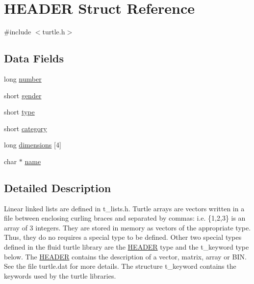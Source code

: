 \hypertarget{struct_h_e_a_d_e_r}{\section{H\-E\-A\-D\-E\-R Struct Reference}
\label{struct_h_e_a_d_e_r}
}


{\ttfamily \#include $<$turtle.\-h$>$}

\subsection*{Data Fields}
\begin{DoxyCompactItemize}
\item 
long \hyperlink{struct_h_e_a_d_e_r_a8cb1e759560a515cbd3abd9b085564e8}{number}
\item 
short \hyperlink{struct_h_e_a_d_e_r_a11fc67d4322c2d06729d3290f60b0a37}{gender}
\item 
short \hyperlink{struct_h_e_a_d_e_r_aa49a7ecb59503c1200ce519378258384}{type}
\item 
short \hyperlink{struct_h_e_a_d_e_r_a85307f8d3e87cf1948d552e7d8439494}{category}
\item 
long \hyperlink{struct_h_e_a_d_e_r_a4af1ef7685e17799673dcada494933a3}{dimensions} \mbox{[}4\mbox{]}
\item 
char $\ast$ \hyperlink{struct_h_e_a_d_e_r_a65f660d696f9e81d8a551199092477d8}{name}
\end{DoxyCompactItemize}


\subsection{Detailed Description}




Linear linked lists are defined in t\-\_\-lists.\-h. Turtle arrays are vectors written in a file between enclosing curling braces and separated by commas\-: i.\-e. \{1,2,3\} is an array of 3 integers. They are stored in memory as vectors of the appropriate type. Thus, they do no requires a special type to be defined. Other two special types defined in the fluid turtle library are the \hyperlink{struct_h_e_a_d_e_r}{H\-E\-A\-D\-E\-R} type and the t\-\_\-keyword type below. The \hyperlink{struct_h_e_a_d_e_r}{H\-E\-A\-D\-E\-R} contains the description of a vector, matrix, array or B\-I\-N. See the file turtle.\-dat for more details. The structure t\-\_\-keyword contains the keywords used by the turtle libraries. 

